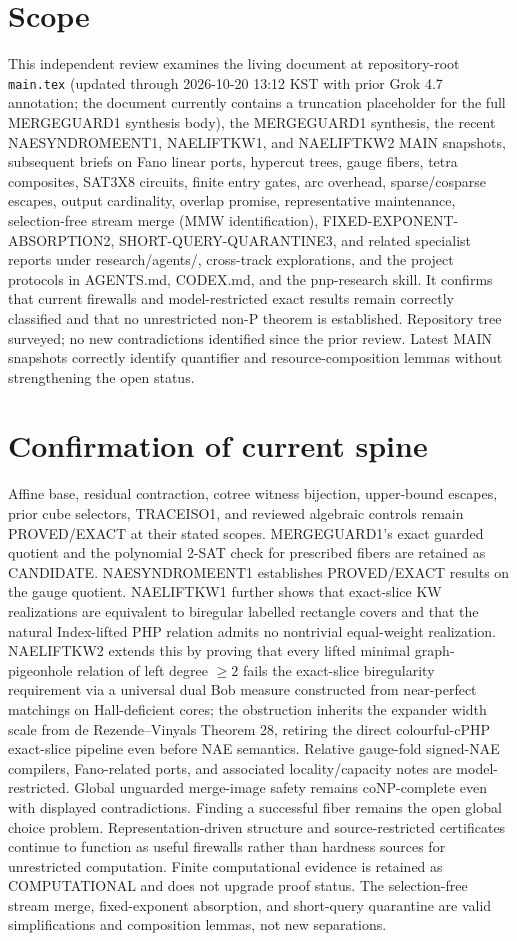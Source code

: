 \documentclass[11pt]{article}
\begin{document}
\section{Scope}
This independent review examines the living document at repository-root \texttt{main.tex} (updated through 2026-10-20 13:12 KST with prior Grok 4.7 annotation; the document currently contains a truncation placeholder for the full MERGEGUARD1 synthesis body), the MERGEGUARD1 synthesis, the recent NAESYNDROMEENT1, NAELIFTKW1, and NAELIFTKW2 MAIN snapshots, subsequent briefs on Fano linear ports, hypercut trees, gauge fibers, tetra composites, SAT3X8 circuits, finite entry gates, arc overhead, sparse/cosparse escapes, output cardinality, overlap promise, representative maintenance, selection-free stream merge (MMW identification), FIXED-EXPONENT-ABSORPTION2, SHORT-QUERY-QUARANTINE3, and related specialist reports under research/agents/, cross-track explorations, and the project protocols in AGENTS.md, CODEX.md, and the pnp-research skill. It confirms that current firewalls and model-restricted exact results remain correctly classified and that no unrestricted non-P theorem is established. Repository tree surveyed; no new contradictions identified since the prior review. Latest MAIN snapshots correctly identify quantifier and resource-composition lemmas without strengthening the open status.

\section{Confirmation of current spine}
Affine base, residual contraction, cotree witness bijection, upper-bound escapes, prior cube selectors, TRACEISO1, and reviewed algebraic controls remain PROVED/EXACT at their stated scopes. MERGEGUARD1's exact guarded quotient and the polynomial 2-SAT check for prescribed fibers are retained as CANDIDATE. NAESYNDROMEENT1 establishes PROVED/EXACT results on the gauge quotient. NAELIFTKW1 further shows that exact-slice KW realizations are equivalent to biregular labelled rectangle covers and that the natural Index-lifted PHP relation admits no nontrivial equal-weight realization. NAELIFTKW2 extends this by proving that every lifted minimal graph-pigeonhole relation of left degree $\ge 2$ fails the exact-slice biregularity requirement via a universal dual Bob measure constructed from near-perfect matchings on Hall-deficient cores; the obstruction inherits the expander width scale from de Rezende--Vinyals Theorem 28, retiring the direct colourful-cPHP exact-slice pipeline even before NAE semantics. Relative gauge-fold signed-NAE compilers, Fano-related ports, and associated locality/capacity notes are model-restricted. Global unguarded merge-image safety remains coNP-complete even with displayed contradictions. Finding a successful fiber remains the open global choice problem. Representation-driven structure and source-restricted certificates continue to function as useful firewalls rather than hardness sources for unrestricted computation. Finite computational evidence is retained as COMPUTATIONAL and does not upgrade proof status. The selection-free stream merge, fixed-exponent absorption, and short-query quarantine are valid simplifications and composition lemmas, not new separations.
\end{document}
